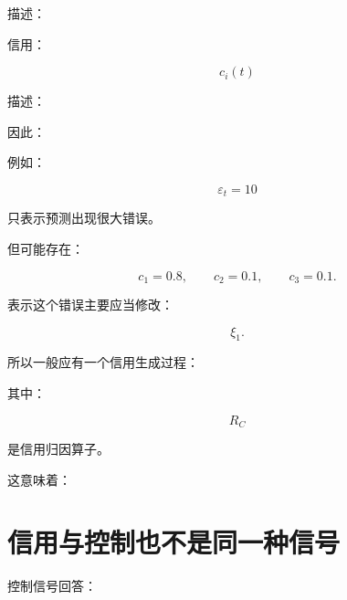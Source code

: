 描述：

\begin{statementbox}
\centering
{}
\end{statementbox}

信用：

\[
c_i(t)
\]

描述：

\begin{statementbox}
\centering
{}
\end{statementbox}

因此：

\begin{statementbox}
\centering
{}
\end{statementbox}

例如：

\[
\varepsilon_t=10
\]

只表示预测出现很大错误。

但可能存在：

\[
c_1=0.8,
\qquad
c_2=0.1,
\qquad
c_3=0.1.
\]

表示这个错误主要应当修改：

\[
\xi_1.
\]

所以一般应有一个信用生成过程：

\begin{statementbox}
\centering
{}
\end{statementbox}

其中：

\[
R_C
\]

是信用归因算子。

这意味着：

\begin{statementbox}
\centering
{}
\end{statementbox}

\section{信用与控制也不是同一种信号}

控制信号回答：

\begin{statementbox}
\centering
{}
\end{statementbox}

